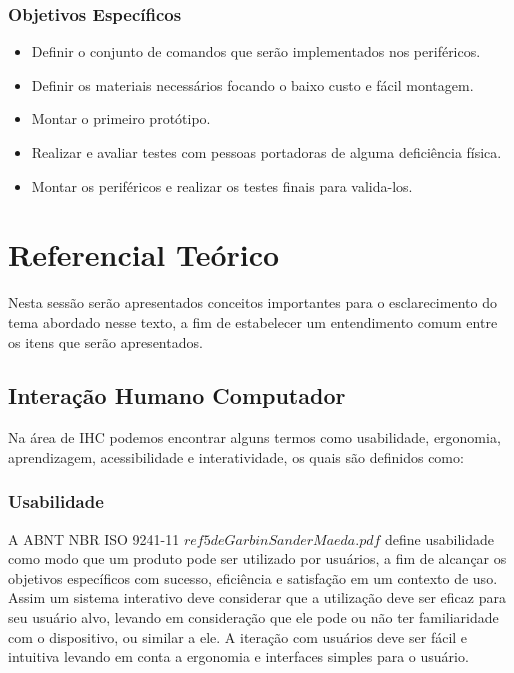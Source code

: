 \documentclass[
	12pt,			%
	openright,		%
	oneside,			%
	a4paper,			%
	chapter=TITLE,		%
	english,			%
	brazil,			%
	]{abntex2}
\begin{document}
\subsection{Objetivos Específicos}
\begin{itemize}
	\item Definir o conjunto de comandos que serão implementados nos periféricos.
	\item Definir os materiais necessários focando o baixo custo e fácil montagem.
	\item Montar o primeiro protótipo.
	\item Realizar e avaliar testes com pessoas portadoras de alguma deficiência física.
	\item Montar os periféricos e realizar os testes finais para valida-los.
\end{itemize}


\chapter{Referencial Teórico}
\label{refteo}

Nesta sessão serão apresentados conceitos importantes para o esclarecimento do tema abordado nesse texto, a fim de estabelecer um entendimento comum entre os itens que serão apresentados.

\section{Interação Humano Computador}

Na área de IHC podemos encontrar alguns termos como usabilidade, ergonomia, aprendizagem, acessibilidade e interatividade, os quais são definidos como:

\subsection{Usabilidade}

A ABNT NBR ISO 9241-11 \(ref 5 de Garbin Sander Maeda.pdf\) define usabilidade como modo que um produto pode ser utilizado por usuários, a fim de alcançar os objetivos específicos com sucesso, eficiência e satisfação em um contexto de uso. Assim um sistema interativo deve considerar que a utilização deve ser eficaz para seu usuário alvo, levando em consideração que ele pode ou não ter familiaridade com o dispositivo, ou similar a ele. A iteração com usuários deve ser fácil e intuitiva levando em conta a ergonomia e interfaces simples para o usuário.
\end{document}
